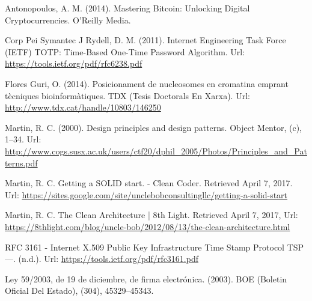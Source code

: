 
\begin{thebibliography}{1}
 Antonopoulos, A. M. (2014). Mastering Bitcoin: Unlocking Digital Cryptocurrencies. O’Reilly Media.

 Corp Pei Symantec J Rydell, D. M. (2011). Internet Engineering Task Force (IETF) TOTP: Time-Based One-Time Password Algorithm. Url: \url{https://tools.ietf.org/pdf/rfc6238.pdf}

 Flores Guri, O. (2014). Posicionament de nucleosomes en cromatina emprant tècniques bioinformàtiques. TDX (Tesis Doctorals En Xarxa). Url: \url{http://www.tdx.cat/handle/10803/146250}

 Martin, R. C. (2000). Design principles and design patterns. Object Mentor, (c), 1–34. Url: \url{http://www.cogs.susx.ac.uk/users/ctf20/dphil_2005/Photos/Principles_and_Patterns.pdf}

 Martin, R. C. Getting a SOLID start. - Clean Coder. Retrieved April 7, 2017. Url: \url{https://sites.google.com/site/unclebobconsultingllc/getting-a-solid-start}

 Martin, R. C. The Clean Architecture | 8th Light. Retrieved April 7, 2017, Url: \url{https://8thlight.com/blog/uncle-bob/2012/08/13/the-clean-architecture.html}

 RFC 3161 - Internet X.509 Public Key Infrastructure Time Stamp Protocol TSP—. (n.d.). Url: \url{https://tools.ietf.org/pdf/rfc3161.pdf}

 Ley 59/2003, de 19 de diciembre, de firma electrónica. (2003). BOE (Boletin Oficial Del Estado), (304), 45329–45343.

\vspace*{0.1in}
\end{thebibliography}